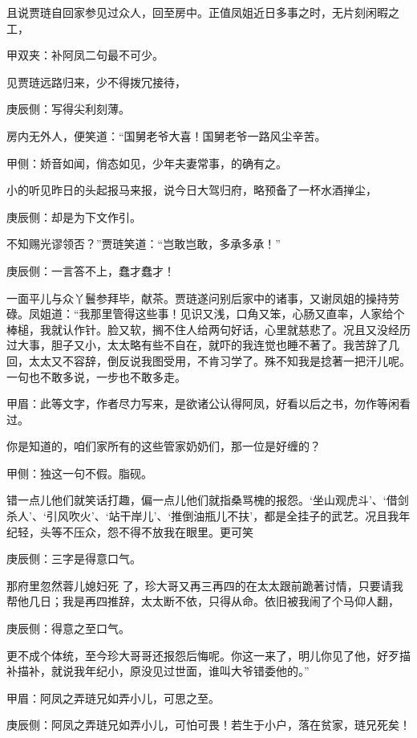 \begin{parag}
    且说贾琏自回家参见过众人，回至房中。正值凤姐近日多事之时，无片刻闲暇之工，\begin{note}甲双夹：补阿凤二句最不可少。\end{note}见贾琏远路归来，少不得拨冗接待，\begin{note}庚辰侧：写得尖利刻薄。\end{note}房内无外人，便笑道：“国舅老爷大喜！国舅老爷一路风尘辛苦。\begin{note}甲侧：娇音如闻，俏态如见，少年夫妻常事，的确有之。\end{note}小的听见昨日的头起报马来报，说今日大驾归府，略预备了一杯水酒掸尘，\begin{note}庚辰侧：却是为下文作引。\end{note}不知赐光谬领否？”贾琏笑道：“岂敢岂敢，多承多承！”\begin{note}庚辰侧：一言答不上，蠢才蠢才！\end{note}一面平儿与众丫鬟参拜毕，献茶。贾琏遂问别后家中的诸事，又谢凤姐的操持劳碌。凤姐道：“我那里管得这些事！见识又浅，口角又笨，心肠又直率，人家给个棒槌，我就认作针。脸又软，搁不住人给两句好话，心里就慈悲了。况且又没经历过大事，胆子又小，太太略有些不自在，就吓的我连觉也睡不著了。我苦辞了几回，太太又不容辞，倒反说我图受用，不肯习学了。殊不知我是捻著一把汗儿呢。一句也不敢多说，一步也不敢多走。\begin{note}甲眉：此等文字，作者尽力写来，是欲诸公认得阿凤，好看以后之书，勿作等闲看过。\end{note}你是知道的，咱们家所有的这些管家奶奶们，那一位是好缠的？\begin{note}甲侧：独这一句不假。脂砚。\end{note}错一点儿他们就笑话打趣，偏一点儿他们就指桑骂槐的报怨。‘坐山观虎斗’、‘借剑杀人’、‘引风吹火’、‘站干岸儿’、‘推倒油瓶儿不扶’，都是全挂子的武艺。况且我年纪轻，头等不压众，怨不得不放我在眼里。更可笑\begin{note}庚辰侧：三字是得意口气。\end{note}那府里忽然蓉儿媳妇死 了，珍大哥又再三再四的在太太跟前跪著讨情，只要请我帮他几日；我是再四推辞，太太断不依，只得从命。依旧被我闹了个马仰人翻，\begin{note}庚辰侧：得意之至口气。\end{note}更不成个体统，至今珍大哥哥还报怨后悔呢。你这一来了，明儿你见了他，好歹描补描补，就说我年纪小，原没见过世面，谁叫大爷错委他的。”\begin{note}甲眉：阿凤之弄琏兄如弄小儿，可思之至。\end{note}\begin{note}庚辰侧：阿凤之弄琏兄如弄小儿，可怕可畏！若生于小户，落在贫家，琏兄死矣！\end{note}
\end{parag}


